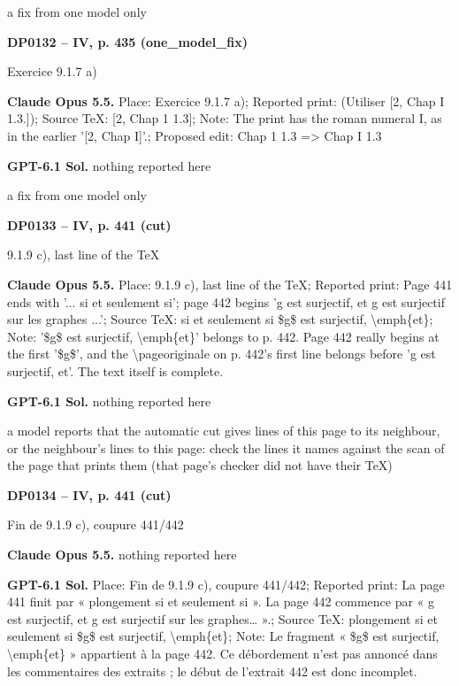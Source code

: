 a fix from one model only\par
\par\noindent\hypertarget{DP0132}{}\textbf{DP0132 -- IV, p. 435 (one\_model\_fix)}\par
Exercice 9.1.7 a)\par
\textbf{Claude Opus 5.5.} Place: Exercice 9.1.7 a); Reported print: (Utiliser [2, Chap I 1.3.]); Source TeX: [2, Chap 1 1.3]; Note: The print has the roman numeral I, as in the earlier '[2, Chap I]'.; Proposed edit: Chap 1 1.3 =\allowbreak > Chap I 1.3\par
\textbf{GPT-6.1 Sol.} nothing reported here\par
a fix from one model only\par
\par\noindent\hypertarget{DP0133}{}\textbf{DP0133 -- IV, p. 441 (cut)}\par
9.1.9 c), last line of the TeX\par
\textbf{Claude Opus 5.5.} Place: 9.1.9 c), last line of the TeX; Reported print: Page 441 ends with '... si et seulement si'; page 442 begins 'g est surjectif, et g est surjectif sur les graphes ...'; Source TeX: si et seulement si \$g\$ est surjectif, \textbackslash{}emph\{et\}; Note: '\$g\$ est surjectif, \textbackslash{}emph\{et\}' belongs to p. 442. Page 442 really begins at the first '\$g\$', and the \textbackslash{}pageoriginale on p. 442's first line belongs before 'g est surjectif, et'. The text itself is complete.\par
\textbf{GPT-6.1 Sol.} nothing reported here\par
a model reports that the automatic cut gives lines of this page to its neighbour, or the neighbour's lines to this page: check the lines it names against the scan of the page that prints them (that page's checker did not have their TeX)\par
\par\noindent\hypertarget{DP0134}{}\textbf{DP0134 -- IV, p. 441 (cut)}\par
Fin de 9.1.9 c), coupure 441/442\par
\textbf{Claude Opus 5.5.} nothing reported here\par
\textbf{GPT-6.1 Sol.} Place: Fin de 9.1.9 c), coupure 441/442; Reported print: La page 441 finit par « plongement si et seulement si ». La page 442 commence par « g est surjectif, et g est surjectif sur les graphes… ».; Source TeX: plongement si et seulement si \$g\$ est surjectif, \textbackslash{}emph\{et\}; Note: Le fragment « \$g\$ est surjectif, \textbackslash{}emph\{et\} » appartient à la page 442. Ce débordement n'est pas annoncé dans les commentaires des extraits ; le début de l'extrait 442 est donc incomplet.\par
